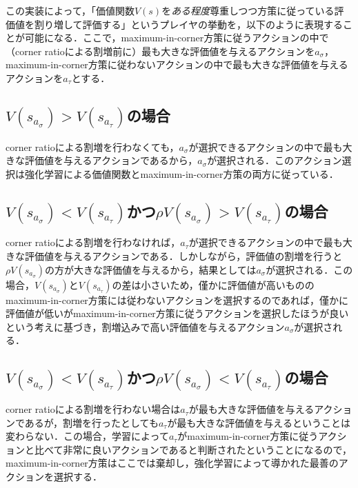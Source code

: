 \documentclass{suribt}
\begin{document}
この実装によって，「価値関数$V(s)$を\emph{ある程度}尊重しつつ方策に従っている評価値を割り増して評価する」というプレイヤの挙動を，以下のように表現することが可能になる．ここで，maximum-in-corner方策に従うアクションの中で（corner ratioによる割増前に）最も大きな評価値を与えるアクションを$a_{\sigma}$，maximum-in-corner方策に従わないアクションの中で最も大きな評価値を与えるアクションを$a_{\tau}$とする．

\subsection{$V(s_{a_{\sigma}}) > V(s_{a_{\tau}})$の場合}
corner ratioによる割増を行わなくても，$a_{\sigma}$が選択できるアクションの中で最も大きな評価値を与えるアクションであるから，$a_{\sigma}$が選択される．このアクション選択は強化学習による価値関数とmaximum-in-corner方策の両方に従っている．

\subsection{$V(s_{a_{\sigma}}) < V(s_{a_{\tau}})$かつ${\rho}V(s_{a_{\sigma}}) > V(s_{a_{\tau}})$の場合}
corner ratioによる割増を行わなければ，$a_{\tau}$が選択できるアクションの中で最も大きな評価値を与えるアクションである．しかしながら，評価値の割増を行うと${\rho}V(s_{a_{\sigma}})$の方が大きな評価値を与えるから，結果としては$a_{\sigma}$が選択される．この場合，$V(s_{a_{\sigma}})$と$V(s_{a_{\tau}})$の差は小さいため，僅かに評価値が高いもののmaximum-in-corner方策には従わないアクションを選択するのであれば，僅かに評価値が低いがmaximum-in-corner方策に従うアクションを選択したほうが良いという考えに基づき，割増込みで高い評価値を与えるアクション$a_{\sigma}$が選択される．

\subsection{$V(s_{a_{\sigma}}) < V(s_{a_{\tau}})$かつ${\rho}V(s_{a_{\sigma}}) < V(s_{a_{\tau}})$の場合}
corner ratioによる割増を行わない場合は$a_{\tau}$が最も大きな評価値を与えるアクションであるが，割増を行ったとしても$a_{\tau}$が最も大きな評価値を与えるということは変わらない．この場合，学習によって$a_{\tau}$がmaximum-in-corner方策に従うアクションと比べて非常に良いアクションであると判断されたということになるので，maximum-in-corner方策はここでは棄却し，強化学習によって導かれた最善のアクションを選択する．

\bigskip
\end{document}
